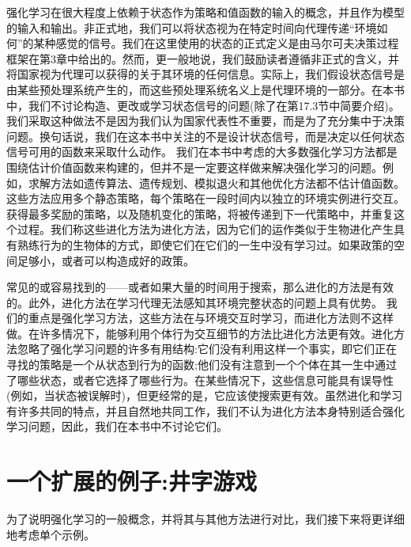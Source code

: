 强化学习在很大程度上依赖于状态作为策略和值函数的输入的概念，并且作为模型的输入和输出。非正式地，我们可以将状态视为在特定时间向代理传递“环境如何”的某种感觉的信号。我们在这里使用的状态的正式定义是由马尔可夫决策过程框架在第3章中给出的。然而，更一般地说，我们鼓励读者遵循非正式的含义，并将国家视为代理可以获得的关于其环境的任何信息。实际上，我们假设状态信号是由某些预处理系统产生的，而这些预处理系统名义上是代理环境的一部分。在本书中，我们不讨论构造、更改或学习状态信号的问题(除了在第17.3节中简要介绍)。我们采取这种做法不是因为我们认为国家代表性不重要，而是为了充分集中于决策问题。换句话说，我们在这本书中关注的不是设计状态信号，而是决定以任何状态信号可用的函数来采取什么动作。
我们在本书中考虑的大多数强化学习方法都是围绕估计价值函数来构建的，但并不是一定要这样做来解决强化学习的问题。例如，求解方法如遗传算法、遗传规划、模拟退火和其他优化方法都不估计值函数。这些方法应用多个静态策略，每个策略在一段时间内以独立的环境实例进行交互。获得最多奖励的策略，以及随机变化的策略，将被传递到下一代策略中，并重复这个过程。我们称这些进化方法为进化方法，因为它们的运作类似于生物进化产生具有熟练行为的生物体的方式，即使它们在它们的一生中没有学习过。如果政策的空间足够小，或者可以构造成好的政策。

常见的或容易找到的——或者如果大量的时间用于搜索，那么进化的方法是有效的。此外，进化方法在学习代理无法感知其环境完整状态的问题上具有优势。
我们的重点是强化学习方法，这些方法在与环境交互时学习，而进化方法则不这样做。在许多情况下，能够利用个体行为交互细节的方法比进化方法更有效。进化方法忽略了强化学习问题的许多有用结构:它们没有利用这样一个事实，即它们正在寻找的策略是一个从状态到行为的函数;他们没有注意到一个个体在其一生中通过了哪些状态，或者它选择了哪些行为。在某些情况下，这些信息可能具有误导性(例如，当状态被误解时)，但更经常的是，它应该使搜索更有效。虽然进化和学习有许多共同的特点，并且自然地共同工作，我们不认为进化方法本身特别适合强化学习问题，因此，我们在本书中不讨论它们。


\section{一个扩展的例子:井字游戏}

为了说明强化学习的一般概念，并将其与其他方法进行对比，我们接下来将更详细地考虑单个示例。



